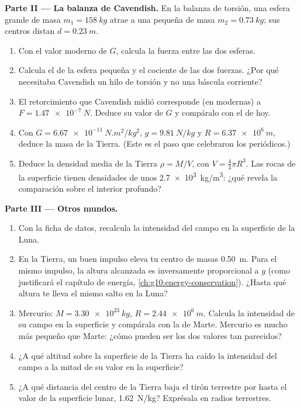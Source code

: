 \begin{problem}
\medskip
\noindent\textbf{Parte II --- La balanza de Cavendish.}
En la balanza de torsión, una esfera grande de masa $m_1 = \qty{158}{kg}$
atrae a una pequeña de masa $m_2 = \qty{0.73}{kg}$; sus centros distan
$d = \qty{0.23}{m}$.
\begin{enumerate}[resume]
  \item Con el valor moderno de $G$, calcula la fuerza entre las dos
        esferas.
  \item Calcula el  de la esfera pequeña y el cociente de las dos
        fuerzas. ¿Por qué necesitaba Cavendish un hilo de torsión y no
        una báscula corriente?
  \item El retorcimiento que Cavendish midió corresponde (en 
        modernas) a $F = \qty{1.47e-7}{N}$. Deduce su valor de $G$ y
        compáralo con el de hoy.
  \item Con $G = \qty{6.67e-11}{N.m^2/kg^2}$, $g = \qty{9.81}{N/kg}$ y
        $R = \qty{6.37e6}{m}$, deduce la masa de la Tierra. (Este es el
        paso que celebraron los periódicos.)
  \item Deduce la densidad media de la Tierra $\rho = M / V$, con
        $V = \frac43 \pi R^3$. Las rocas de la superficie tienen
        densidades de unos \qty{2.7e3}{kg/m^3}: ¿qué revela la
        comparación sobre el interior profundo?
\end{enumerate}

\medskip
\noindent\textbf{Parte III --- Otros mundos.}
\begin{enumerate}[resume]
  \item Con la ficha de datos, recalcula la intensidad del campo en la
        superficie de la Luna.
  \item En la Tierra, un buen impulso eleva tu centro de masas
        \qty{0.50}{m}. Para el mismo impulso, la altura alcanzada es
        inversamente proporcional a $g$ (como justificará el capítulo de
        energía, \cref{ch:g10:energy-conservation}). ¿Hasta qué altura
        te lleva el mismo salto en la Luna?
  \item Mercurio: $M = \qty{3.30e23}{kg}$, $R = \qty{2.44e6}{m}$.
        Calcula la intensidad de su campo en la superficie y compárala
        con la de Marte. Mercurio es mucho más pequeño que Marte:
        ¿cómo pueden ser los dos valores tan parecidos?
  \item ¿A qué altitud sobre la superficie de la Tierra ha caído la
        intensidad del campo a la mitad de su valor en la superficie?
  \item ¿A qué distancia del centro de la Tierra baja el tirón terrestre
        por  hasta el valor de la superficie lunar,
        \qty{1.62}{N/kg}? Exprésala en radios terrestres.
\end{enumerate}


\end{problem}
